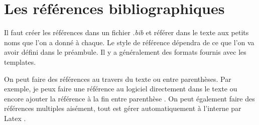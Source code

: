 \documentclass[exemple_master.tex]{subfiles}
\begin{document}
\section{Les références bibliographiques}

Il faut créer les références dans un fichier \emph{.bib} et référer dans le texte aux petits noms que l'on a donné à chaque. Le style de référence dépendra de ce que l'on va avoir défini dans le préambule. Il y a généralement des formats fournis avec les templates.

On peut faire des références au travers du texte ou entre parenthèses. Par exemple, je peux faire une référence au logiciel \cite{WHAT2016} directement dans le texte ou encore ajouter la référence à la fin entre parenthèse \citep{WHAT2016}. On peut également faire des références multiples aisément, tout est gérer automatiquement à l'interne par Latex \citep{WHAT2016,ladeveze2016}.
\end{document}
